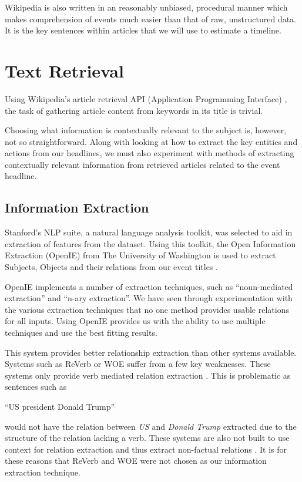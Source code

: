 \documentclass[bsc,frontabs,twoside,singlespacing,parskip,deptreport]{infthesis}     %
\begin{document}
Wikipedia is also written in an reasonably unbiased, procedural manner which makes comprehension of events much
easier than that of raw, unstructured data.
It is the key sentences within articles that we will use to estimate a timeline.

\section{Text Retrieval}
Using Wikipedia's article retrieval API (Application Programming Interface) \cite{wikipediaAPI}, the task of gathering article content
from keywords in its title is trivial.

Choosing what information is contextually relevant to the subject is, however, not so straightforward.
Along with looking at how to extract the key entities and actions from our 
headlines, we must also experiment with methods of extracting contextually relevant information from
retrieved articles related to the event headline.

\subsection{Information Extraction}
Stanford's NLP suite,
a natural language analysis toolkit,
was selected to aid in extraction of features from the dataset.
Using this toolkit, the Open Information Extraction (OpenIE) from
The University of Washington is used to extract Subjects, Objects
and their relations from our event titles \cite{schmitz2012open}.


OpenIE implements a number of extraction techniques, such as ``noun-mediated extraction'' and ``n-ary extraction''.
We have seen through experimentation with the various extraction techniques that no one method provides
usable relations for all inputs. Using OpenIE provides us with the ability to use multiple techniques and
use the best fitting results.

This system provides better relationship extraction than other systems available. Systems such as
ReVerb or WOE suffer from a few key weaknesses. These systems only provide verb mediated relation extraction \cite{schmitz2012open}. This is problematic as sentences such as

``US president Donald Trump''

would not have the relation between \textit{US} and \textit{Donald Trump} extracted due to the structure of the relation lacking a verb.
These systems are also not built to use context for relation extraction and thus extract non-factual relations \cite{schmitz2012open}.
It is for these reasons that ReVerb and WOE were not chosen as our information extraction technique.
\end{document}
